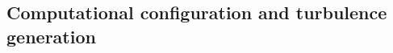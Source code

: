 \documentclass[lineno]{JFM-FLM_Au}
\begin{document}
\newpage
%

\subsection{Computational configuration and turbulence generation}
\label{sec:method_configuration}

\end{document}
